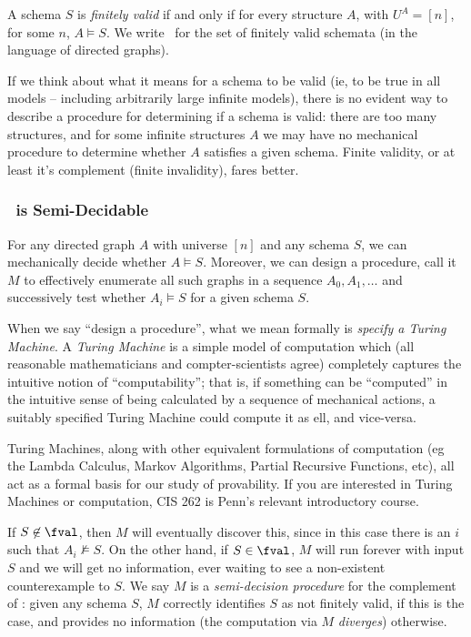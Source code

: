 \begin{definition}
A schema $S$ is \emph{finitely valid} if and only if for every structure $A$, with $U^A=[n]$, for some $n$, $A\models S$. We write \fval\ for the set of finitely valid schemata (in the language of directed graphs).
\end{definition}

If we think about what it means for a schema to be valid (ie, to be true in all models -- including arbitrarily large infinite models), there is no evident way to describe a procedure for determining if a schema is valid: there are too many structures, and for some infinite structures $A$ we may have no mechanical procedure to determine whether $A$ satisfies a given schema. Finite validity, or at least it's complement (finite invalidity), fares better. 

\subsubsection*{\fval\ is Semi-Decidable}
For any directed graph $A$ with universe $[n]$ and any schema $S$, we can mechanically decide whether $A\models S$. Moreover, we can design a procedure, call it $M$ to effectively enumerate all such graphs in a sequence $A_0, A_1, \ldots$ and successively test whether $A_i\models S$ for a given schema $S$. 

\begin{aside}
    When we say ``design a procedure'', what we mean formally is \emph{specify a Turing Machine}. A \emph{Turing Machine} is a simple model of computation which (all reasonable mathematicians and compter-scientists agree) completely captures the intuitive notion of ``computability''; that is, if something can be ``computed'' in the intuitive sense of being calculated by a sequence of mechanical actions, a suitably specified Turing Machine could compute it as ell, and vice-versa. 

    Turing Machines, along with other equivalent formulations of computation (eg the Lambda Calculus, Markov Algorithms, Partial Recursive Functions, etc), all act as a formal basis for our study of provability. If you are interested in Turing Machines or computation, CIS 262 is Penn's relevant introductory course. 
\end{aside}

If $S\not\in\fval$, then $M$ will eventually discover this, since in this case there is an $i$ such that $A_i\not\models S$. On the other hand, if $S\in\fval$, $M$ will run forever with input $S$ and we will get no information, ever waiting to see a non-existent counterexample to $S$. We say $M$ is a \emph{semi-decision procedure} for the complement of \fval:  given any schema $S$, $M$ correctly identifies $S$ as not finitely valid, if this is the case, and provides no information (the computation via $M$ \emph{diverges}) otherwise. 


